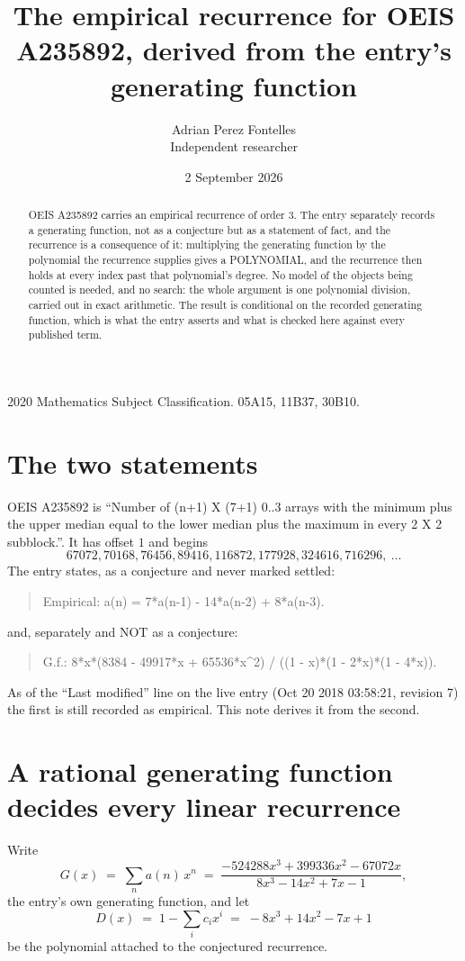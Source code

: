 \documentclass[11pt,a4paper]{article}
\title{The empirical recurrence for OEIS A235892, derived from the entry's generating function}
\author{Adrian Perez Fontelles\\ \small Independent researcher}
\date{2 September 2026}
\theoremstyle{plain}
\theoremstyle{definition}
\begin{document}
\maketitle

\begin{abstract}
OEIS A235892 carries an empirical recurrence of order $3$. The entry separately records a
generating function, not as a conjecture but as a statement of fact, and the recurrence is a
consequence of it: multiplying the generating function by the polynomial the recurrence
supplies gives a POLYNOMIAL, and the recurrence then holds at every index past that
polynomial's degree. No model of the objects being counted is needed, and no search: the
whole argument is one polynomial division, carried out in exact arithmetic. The result is
conditional on the recorded generating function, which is what the entry asserts and what is
checked here against every published term.
\end{abstract}

\noindent\small 2020 Mathematics Subject Classification. 05A15, 11B37, 30B10.\normalsize

\section{The two statements}

OEIS A235892 is ``Number of (n+1) X (7+1) 0..3 arrays with the minimum plus the upper median equal to the lower median plus the maximum in every 2 X 2 subblock.''. It has offset $1$ and begins
\[
67072, 70168, 76456, 89416, 116872, 177928, 324616, 716296,\ \dots
\]
The entry states, as a conjecture and never marked settled:
\begin{quote}
Empirical: a(n) = 7*a(n-1) - 14*a(n-2) + 8*a(n-3).
\end{quote}
and, separately and NOT as a conjecture:
\begin{quote}
G.f.: 8*x*(8384 - 49917*x + 65536*x\^{}2) / ((1 - x)*(1 - 2*x)*(1 - 4*x)).
\end{quote}
As of the ``Last modified'' line on the live entry (Oct 20 2018 03:58:21, revision 7) the first is still
recorded as empirical. This note derives it from the second.

\section{A rational generating function decides every linear recurrence}

Write
\[
G(x)\;=\;\sum_{n}a(n)\,x^{n}\;=\;\frac{- 524288 x^{3} + 399336 x^{2} - 67072 x}{8 x^{3} - 14 x^{2} + 7 x - 1},
\]
the entry's own generating function, and let
\[
D(x)\;=\;1-\sum_i c_i x^{i}\;=\;- 8 x^{3} + 14 x^{2} - 7 x + 1
\]
be the polynomial attached to the conjectured recurrence.
\end{document}
